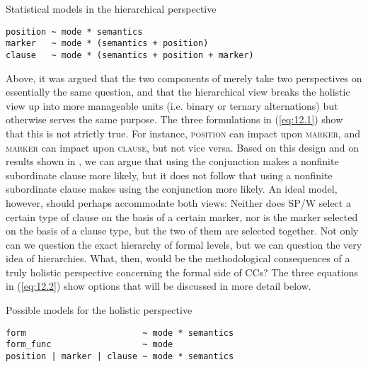\ea
\label{bkm:Ref81816324}\label{eq:12.1}Statistical models in the hierarchical perspective
\begin{lstlisting}
position ~ mode * semantics
marker   ~ mode * (semantics + position)
clause   ~ mode * (semantics + position + marker)
\end{lstlisting}
\z

Above, it was argued that the two components of  merely take two perspectives on essentially the same question, and that the hierarchical view breaks the holistic view up into more manageable units (i.e. binary or ternary alternations) but otherwise serves the same purpose. The three formulations in (\ref{eq:12.1}) show that this is not strictly true. For instance, \textsc{position} can impact upon \textsc{marker}, and \textsc{marker} can impact upon \textsc{clause}, but not vice versa. Based on this design and on results shown in , we can argue that using the conjunction  makes a nonfinite subordinate clause more likely, but it does not follow that using a nonfinite subordinate clause makes using the conjunction  more likely. An ideal model, however, should perhaps accommodate both views: Neither does SP/W select a certain type of clause on the basis of a certain marker, nor is the marker selected on the basis of a clause type, but the two of them are selected together. Not only can we question the exact hierarchy of formal levels, but we can question the very idea of hierarchies. What, then, would be the methodological consequences of a truly holistic perspective concerning the formal side of CCs? The three equations in (\ref{eq:12.2}) show options that will be discussed in more detail below.

\ea
\label{bkm:Ref81816371}\label{eq:12.2}Possible models for the holistic perspective
\begin{lstlisting}
form                       ~ mode * semantics
form_func                  ~ mode
position | marker | clause ~ mode * semantics
\end{lstlisting}
\z\largerpage


